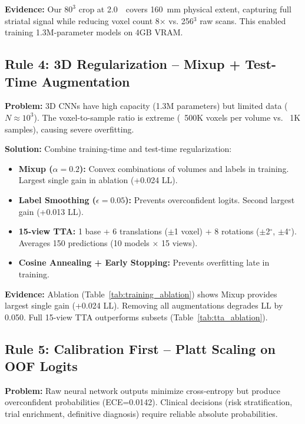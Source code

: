\textbf{Evidence:} Our $80^3$ crop at 2.0~\voxelunit~covers 160~mm physical extent, capturing full striatal signal while reducing voxel count 8$\times$ vs. 256$^3$ raw scans. This enabled training 1.3M-parameter models on 4GB VRAM.

\subsection{Rule 4: 3D Regularization -- Mixup + Test-Time Augmentation}
\label{rule:regularization}

\textbf{Problem:} 3D CNNs have high capacity (1.3M parameters) but limited data ($N \approx 10^3$). The voxel-to-sample ratio is extreme (~500K voxels per volume vs. ~1K samples), causing severe overfitting.

\textbf{Solution:} Combine training-time and test-time regularization:
\begin{itemize}
    \item \textbf{Mixup ($\alpha=0.2$):} Convex combinations of volumes and labels in training. Largest single gain in ablation (+0.024 LL).
    \item \textbf{Label Smoothing ($\epsilon=0.05$):} Prevents overconfident logits. Second largest gain (+0.013 LL).
    \item \textbf{15-view TTA:} 1 base + 6 translations ($\pm$1 voxel) + 8 rotations ($\pm$2$^\circ$, $\pm$4$^\circ$). Averages 150 predictions (10 models $\times$ 15 views).
    \item \textbf{Cosine Annealing + Early Stopping:} Prevents overfitting late in training.
\end{itemize}

\textbf{Evidence:} Ablation (Table~\ref{tab:training_ablation}) shows Mixup provides largest single gain (+0.024 LL). Removing all augmentations degrades LL by 0.050. Full 15-view TTA outperforms subsets (Table~\ref{tab:tta_ablation}).

\subsection{Rule 5: Calibration First -- Platt Scaling on OOF Logits}
\label{rule:calibration}

\textbf{Problem:} Raw neural network outputs minimize cross-entropy but produce overconfident probabilities (ECE=0.0142). Clinical decisions (risk stratification, trial enrichment, definitive diagnosis) require reliable absolute probabilities.


